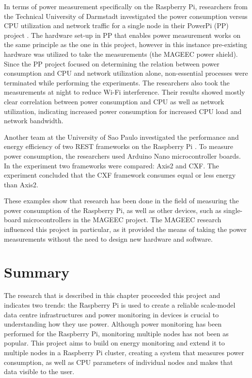 \documentclass{l4proj}
\begin{document}
\noindent
In terms of power measurement specifically on the Raspberry Pi, researchers from the Technical University of Darmstadt investigated the power consumption versus CPU utilization and network traffic for a single node in their PowerPi (PP) project \cite{kaup_gottschling_hausheer_2014}. The hardware set-up in PP that enables power measurement works on the same principle as the one in this project, however in this instance pre-existing hardware was utilized to take the measurements (the MAGEEC power shield). Since the PP project focused on determining the relation between power consumption and CPU and network utilization alone, non-essential processes were terminated while performing the experiments. The researchers also took the measurements at night to reduce Wi-Fi interference. Their results showed mostly clear correlation between power consumption and CPU as well as network utilization, indicating increased power consumption for increased CPU load and network bandwidth. 

\noindent
Another team at the University of Sao Paulo investigated the performance and energy efficiency of two REST frameworks on the Raspberry Pi \cite{nunes_et_al_2014}. To measure power consumption, the researchers used Arduino Nano microcontroller boards. In the experiment two frameworks were compared: Axis2 and CXF. The experiment concluded that the CXF framework consumes equal or less energy than Axis2.

\noindent
These examples show that research has been done in the field of measuring the power consumption of the Raspberry Pi, as well as other devices, such as single-board microcontrollers in the MAGEEC project. The MAGEEC research influenced this project in particular, as it provided the means of taking the power measurements without the need to design new hardware and software.

\section{Summary}
The research that is described in this chapter proceeded this project and indicates two trends: the Raspberry Pi is used to create a reliable scale-model data centre infrastructures and power monitoring in devices is crucial to understanding how they use power. Although power monitoring has been performed for the Raspberry Pi, monitoring multiple nodes has not been as popular. This project aims to build on energy monitoring and extend it to multiple nodes in a Raspberry Pi cluster, creating a system that measures power consumption, as well as CPU parameters of individual nodes and makes that data visible to the user.
\end{document}
